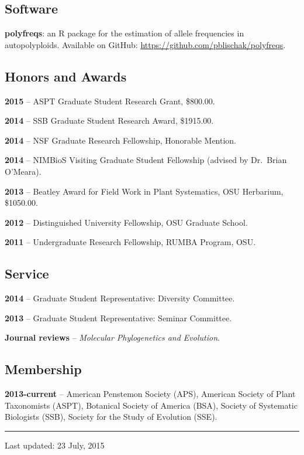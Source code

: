 \documentclass[]{article}
\begin{document}
\subsection{\texorpdfstring{\textbf{Software}}{Software}}\label{software}

\textbf{polyfreqs}: an R package for the estimation of allele
frequencies in autopolyploids. Available on GitHub:
\href{https://github.com/pblischak/polyfreqs}{\url{https://github.com/pblischak/polyfreqs}}.

\subsection{\texorpdfstring{\textbf{Honors and
Awards}}{Honors and Awards}}\label{honors-and-awards}

\textbf{2015} -- ASPT Graduate Student Research Grant, \$800.00.

\textbf{2014} -- SSB Graduate Student Research Award, \$1915.00.

\textbf{2014} -- NSF Graduate Research Fellowship, Honorable Mention.

\textbf{2014} -- NIMBioS Visiting Graduate Student Fellowship (advised
by Dr.~Brian O'Meara).

\textbf{2013} -- Beatley Award for Field Work in Plant Systematics, OSU
Herbarium, \$1050.00.

\textbf{2012} -- Distinguished University Fellowship, OSU Graduate
School.

\textbf{2011} -- Undergraduate Research Fellowship, RUMBA Program, OSU.

\subsection{\texorpdfstring{\textbf{Service}}{Service}}\label{service}

\textbf{2014} -- Graduate Student Representative: Diversity Committee.

\textbf{2013} -- Graduate Student Representative: Seminar Committee.

\textbf{Journal reviews} -- \emph{Molecular Phylogenetics and
Evolution}.

\subsection{\texorpdfstring{\textbf{Membership}}{Membership}}\label{membership}

\textbf{2013-current} -- American Penstemon Society (APS), American
Society of Plant Taxonomists (ASPT), Botanical Society of America (BSA),
Society of Systematic Biologists (SSB), Society for the Study of
Evolution (SSE).

\begin{center}\rule{0.5\linewidth}{\linethickness}\end{center}

Last updated: 23 July, 2015
\end{document}
